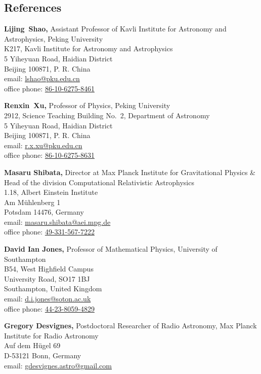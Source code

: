 \documentclass[margin,line]{res}
\begin{document}
\begin{resume}
\section{\sc References}
\vspace*{.05in}
\parbox{\textwidth}{%
{\bf Lijing~Shao,} Assistant Professor of Kavli Institute for Astronomy and Astrophysics, Peking University \\
K217, Kavli Institute for Astronomy and Astrophysics  \\
5 Yiheyuan Road, Haidian District \\
Beijing 100871, P. R. China \\
email: \href{mailto:lshao@pku.edu.cn}{lshao@pku.edu.cn} \\
office phone: \href{tel: 86-10-6275-8461}{ 86-10-6275-8461}}
\par
\parbox{\textwidth}{%
{\bf Renxin~Xu,} Professor of Physics, Peking University\\
2912, Science Teaching Building No.~2, Department of Astronomy\\
5 Yiheyuan Road, Haidian District \\
Beijing 100871, P. R. China \\
email: \href{mailto:r.x.xu@pku.edu.cn}{r.x.xu@pku.edu.cn} \\
office phone: \href{tel:86-10-6275-8631}{86-10-6275-8631}}
\par
\parbox{\textwidth}{%
{\bf Masaru Shibata,} Director at Max Planck Institute for Gravitational Physics \&
Head of the division Computational Relativistic Astrophysics\\
1.18, Albert Einstein Institute\\
Am Mühlenberg 1 \\
Potsdam 14476, Germany \\
email: \href{mailto:masaru.shibata@aei.mpg.de}{masaru.shibata@aei.mpg.de} \\
office phone: \href{tel:49-331-567-7222}{49-331-567-7222}}
\par
\parbox{\textwidth}{%
{\bf David Ian Jones,} Professor of Mathematical Physics, University of Southampton\\
B54, West Highfield Campus\\
University Road, SO17 1BJ\\
Southampton, United Kingdom \\
email: \href{mailto:d.i.jones@soton.ac.uk}{d.i.jones@soton.ac.uk} \\
office phone: \href{tel:44-23-8059-4829}{44-23-8059-4829}}
\par
\parbox{\textwidth}{%
{\bf Gregory Desvignes,} Postdoctoral Researcher of Radio Astronomy, Max Planck Institute for Radio Astronomy\\
Auf dem Hügel 69\\
D-53121 Bonn, Germany\\
email: \href{mailto:gdesvignes.astro@gmail.com}{gdesvignes.astro@gmail.com}}

\end{resume}
\end{document}
